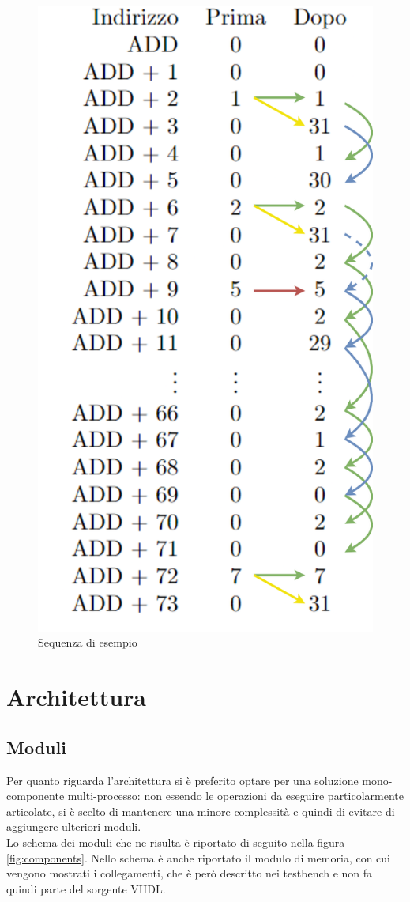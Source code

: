 \documentclass{article}
\begin{document}
\begin{figure}[H]
    \centering
    \includegraphics[width=0.5\linewidth]{Example sequence.drawio.png}
    \caption{Sequenza di esempio}
    \label{fig:example-sequence}
\end{figure}


\section{Architettura}

\subsection{Moduli}

Per quanto riguarda l'architettura si è preferito optare per una soluzione mono-componente multi-processo: non essendo le operazioni da eseguire particolarmente articolate, si è scelto di mantenere una minore complessità e quindi di evitare di aggiungere ulteriori moduli. \\
Lo schema dei moduli che ne risulta è riportato di seguito nella figura \ref{fig:components}.
Nello schema è anche riportato il modulo di memoria, con cui vengono mostrati i collegamenti, che è però descritto nei testbench e non fa quindi parte del sorgente VHDL.
\end{document}
